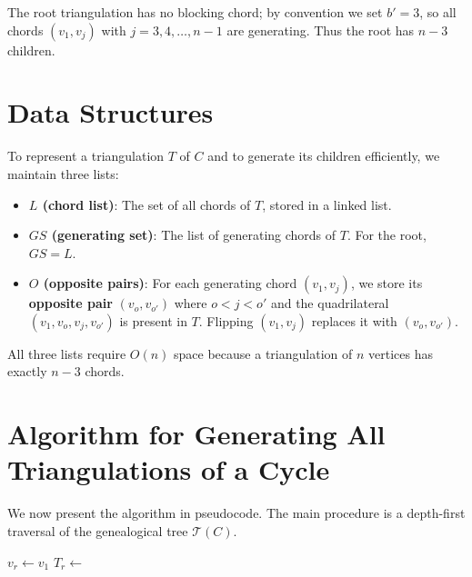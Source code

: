 The root triangulation has no blocking chord; by convention we set \(b' = 3\), so all chords \((v_1, v_j)\) with \(j = 3,4,\dots,n-1\) are generating. 
Thus the root has \(n-3\) children.

\section{Data Structures}
\label{sec:data_structures_cycle}

To represent a triangulation \(T\) of \(C\) and to generate its children efficiently, we maintain three lists:

\begin{itemize}
    \item \textbf{\(L\) (chord list)}: The set of all chords of \(T\), stored in a linked list.
    \item \textbf{\(GS\) (generating set)}: The list of generating chords of \(T\). 
    For the root, \(GS = L\).
    \item \textbf{\(O\) (opposite pairs)}: For each generating chord \((v_1, v_j)\), we store its \textbf{opposite pair} \((v_o, v_{o'})\) where \(o < j < o'\) and the quadrilateral \((v_1, v_o, v_j, v_{o'})\) is present in \(T\). 
    Flipping \((v_1, v_j)\) replaces it with \((v_o, v_{o'})\).
\end{itemize}

All three lists require \(O(n)\) space because a triangulation of \(n\) vertices has exactly \(n-3\) chords.

\section{Algorithm for Generating All Triangulations of a Cycle}
\label{sec:cycle_algorithm_pseudocode}

We now present the algorithm in pseudocode. 
The main procedure is a depth-first traversal of the genealogical tree \(\mathcal{T}(C)\).

\begin{algorithm}[htbp]
    \caption{GenerateAllTriangulationsCycle}
    \label{alg:cycle_main}
    \begin{algorithmic}[1]
            \State $v_r \gets v_1$ 
            \State $T_r \gets$ 
            \State {}
            \State {}
        \EndProcedure
    \end{algorithmic}
\end{algorithm}

